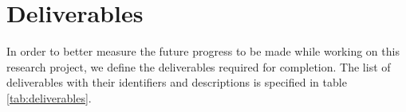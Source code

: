 \documentclass[../main.tex]{subfiles}
\begin{document}
\section{Deliverables}\label{sec:deliv}

In order to better measure the future progress to be made while working on this research project, we define the deliverables required for completion.
The list of deliverables with their identifiers and descriptions is specified in table \ref{tab:deliverables}.










\end{document}
